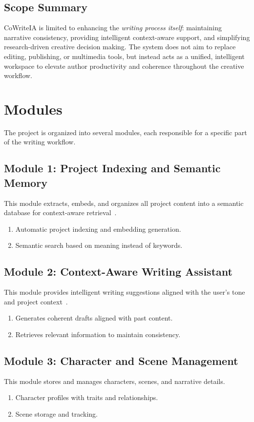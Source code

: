 \subsection*{Scope Summary}

CoWriteIA is limited to enhancing the \emph{writing process itself}: maintaining narrative consistency, providing intelligent context-aware support, and simplifying research-driven creative decision making. The system does not aim to replace editing, publishing, or multimedia tools, but instead acts as a unified, intelligent workspace to elevate author productivity and coherence throughout the creative workflow.

\section{Modules}

The project is organized into several modules, each responsible for a specific part of the writing workflow.

\subsection{Module 1: Project Indexing and Semantic Memory}
This module extracts, embeds, and organizes all project content into a semantic database for context-aware retrieval~\cite{reimers2019sentencebert}. 
\begin{enumerate}
    \item Automatic project indexing and embedding generation.
    \item Semantic search based on meaning instead of keywords.
\end{enumerate}

\subsection{Module 2: Context-Aware Writing Assistant}
This module provides intelligent writing suggestions aligned with the user's tone and project context~\cite{lewis2020rag}.
\begin{enumerate}
    \item Generates coherent drafts aligned with past content.
    \item Retrieves relevant information to maintain consistency.
\end{enumerate}

\subsection{Module 3: Character and Scene Management}
This module stores and manages characters, scenes, and narrative details. 
\begin{enumerate}
    \item Character profiles with traits and relationships.
    \item Scene storage and tracking.
\end{enumerate}

